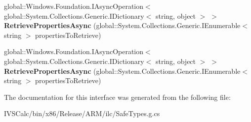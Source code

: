 \begin{DoxyCompactItemize}
\item 
\mbox{\label{interface_windows_1_1_storage_1_1_file_properties_1_1_i_storage_item_extra_properties_a7dfadacf0d528644213ab42e8a7defbe}} 
global\+::\+Windows.\+Foundation.\+I\+Async\+Operation$<$ global\+::\+System.\+Collections.\+Generic.\+I\+Dictionary$<$ string, object $>$ $>$ {\bfseries Retrieve\+Properties\+Async} (global\+::\+System.\+Collections.\+Generic.\+I\+Enumerable$<$ string $>$ properties\+To\+Retrieve)
\item 
\mbox{\label{interface_windows_1_1_storage_1_1_file_properties_1_1_i_storage_item_extra_properties_a7dfadacf0d528644213ab42e8a7defbe}} 
global\+::\+Windows.\+Foundation.\+I\+Async\+Operation$<$ global\+::\+System.\+Collections.\+Generic.\+I\+Dictionary$<$ string, object $>$ $>$ {\bfseries Retrieve\+Properties\+Async} (global\+::\+System.\+Collections.\+Generic.\+I\+Enumerable$<$ string $>$ properties\+To\+Retrieve)
\end{DoxyCompactItemize}


The documentation for this interface was generated from the following file\+:\begin{DoxyCompactItemize}
\item 
I\+V\+S\+Calc/bin/x86/\+Release/\+A\+R\+M/ilc/Safe\+Types.\+g.\+cs\end{DoxyCompactItemize}
